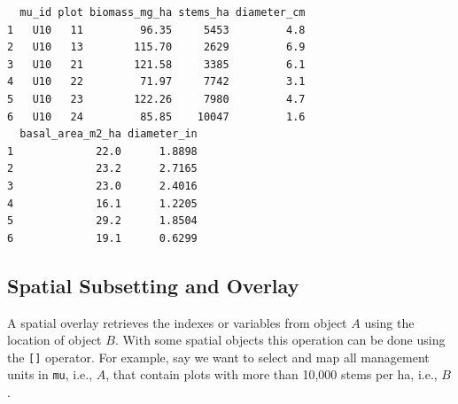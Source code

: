 \documentclass[]{krantz}
\makeatletter
\newenvironment{Shaded}{\begin{snugshade}}{\end{snugshade}}
\newcommand{\ErrorTok}[1]{\textcolor[rgb]{0.14,0.14,0.14}{\textbf{#1}}}
\newcommand{\FloatTok}[1]{\textcolor[rgb]{0.06,0.06,0.06}{#1}}
\newcommand{\KeywordTok}[1]{\textcolor[rgb]{0.27,0.27,0.27}{\textbf{#1}}}
\newcommand{\NormalTok}[1]{#1}
\newcommand{\OperatorTok}[1]{\textcolor[rgb]{0.43,0.43,0.43}{\textbf{#1}}}
\newcommand{\StringTok}[1]{\textcolor[rgb]{0.5,0.5,0.5}{#1}}
\newenvironment{kframe}{%
\medskip{}
\setlength{\fboxsep}{.8em}
 \def\at@end@of@kframe{}%
 \ifinner\ifhmode%
  \def\at@end@of@kframe{\end{minipage}}%
  \begin{minipage}{\columnwidth}%
 \fi\fi%
 \def\FrameCommand##1{\hskip\@totalleftmargin \hskip-\fboxsep
 \colorbox{shadecolor}{##1}\hskip-\fboxsep
     \hskip-\linewidth \hskip-\@totalleftmargin \hskip\columnwidth}%
 \MakeFramed {\advance\hsize-\width
   \@totalleftmargin\z@ \linewidth\hsize
   \@setminipage}}%
 {\par\unskip\endMakeFramed%
 \at@end@of@kframe}
\renewenvironment{Shaded}{\begin{kframe}}{\end{kframe}}
\makeatother
\begin{document}
\begin{Shaded}
\end{Shaded}

\begin{verbatim}
  mu_id plot biomass_mg_ha stems_ha diameter_cm
1   U10   11         96.35     5453         4.8
2   U10   13        115.70     2629         6.9
3   U10   21        121.58     3385         6.1
4   U10   22         71.97     7742         3.1
5   U10   23        122.26     7980         4.7
6   U10   24         85.85    10047         1.6
  basal_area_m2_ha diameter_in
1             22.0      1.8898
2             23.2      2.7165
3             23.0      2.4016
4             16.1      1.2205
5             29.2      1.8504
6             19.1      0.6299
\end{verbatim}

\hypertarget{spatial-subsetting-and-overlay}{%
\subsection{Spatial Subsetting and Overlay}\label{spatial-subsetting-and-overlay}}

A spatial overlay retrieves the indexes or variables from object \(A\) using the location of object \(B\). With some spatial objects this operation can be done using the \texttt{{[}{]}} operator. For example, say we want to select and map all management units in \texttt{mu}, i.e., \(A\), that contain plots with more than 10,000 stems per ha, i.e., \(B\).
\end{document}

